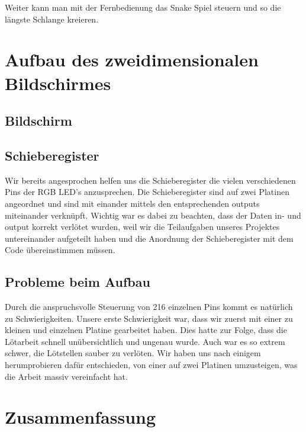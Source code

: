 \documentclass[12pt,a4paper]{article}
\begin{document}
Weiter kann man mit der Fernbedienung das Snake Spiel steuern und so die längste Schlange kreieren.

\section{Aufbau des zweidimensionalen Bildschirmes}

\subsection{Bildschirm}

\subsection{Schieberegister}

Wir bereits angesprochen helfen uns die Schieberegister die vielen verschiedenen Pins der RGB LED's anzusprechen.
Die Schieberegister sind auf zwei Platinen angeordnet und sind mit einander mittels den entsprechenden outputs miteinander
verknüpft. Wichtig war es dabei zu beachten, dass der Daten in- und output korrekt verlötet wurden, weil wir die Teilaufgaben
unseres Projektes untereinander aufgeteilt haben und die Anordnung der Schieberegister mit dem Code übereinstimmen müssen.

\subsection{Probleme beim Aufbau}

Durch die anspruchsvolle Steuerung von 216 einzelnen Pins kommt es
natürlich zu Schwierigkeiten. Unsere erste Schwierigkeit war, dass wir 
zuerst mit einer zu kleinen und einzelnen Platine gearbeitet haben. 
Dies hatte zur Folge, dass die Lötarbeit schnell unübersichtlich und ungenau wurde.
Auch war es so extrem schwer, die Lötstellen sauber zu verlöten. Wir haben uns nach einigem herumprobieren dafür entschieden, von einer auf zwei Platinen umzusteigen, was die Arbeit massiv vereinfacht hat.

\section{Zusammenfassung}
\end{document}
